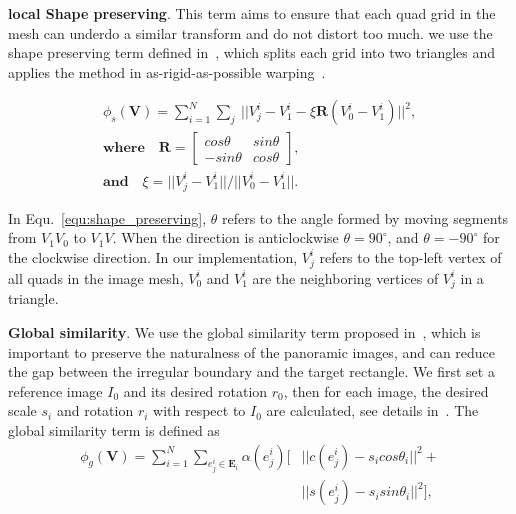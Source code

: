 \documentclass[10pt,journal,compsoc]{IEEEtran}
\begin{document}
\textbf{local Shape preserving}.
This term aims to ensure that each quad grid in the mesh can underdo a similar transform and do not distort too much.
we use the shape preserving term defined in~\cite{journals/tog/LiuYT013}, which splits each grid into two triangles and applies the method in as-rigid-as-possible warping~\cite{journals/tog/IgarashiMH05}.

\begin{equation} \label{equ:shape_preserving}
\begin{split}
    \phi_s(\mathbf{V}) = \sum\limits_{i=1}^N\sum\limits_{j} \
    ||V_j^i -V_1^i-\xi \mathbf{R}(V_0^i -V_1^i)||^2, \\
   \textbf{where}\quad \mathbf{R}=\left[\begin{array}{cc}cos\theta&sin\theta \\-sin\theta&cos\theta\end{array}\right], \\
    \textbf{and} \quad\xi=||V_j^i -V_1^i||/||V_0^i -V_1^i||.
\end{split}
\end{equation}

In Equ.~\ref{equ:shape_preserving}, $\theta$ refers to the angle formed by moving segments from $V_1V_0$ to $V_1V$. 
When the direction is anticlockwise $\theta=90^{\circ}$, and $\theta=-90^{\circ}$ for the clockwise direction. 
In our implementation, $V_j^i$ refers to the top-left vertex of all quads in the image mesh, $V_0^i$ and $V_1^i$ are the neighboring vertices of $V_j^i$ in a triangle.

\textbf{Global similarity}.
We use the global similarity term proposed in~\cite{conf/eccv/ChenC16}, which is important to preserve the naturalness of the panoramic images, and can reduce the gap between the irregular boundary and the target rectangle.
We first set a reference image $I_0$ and its desired rotation $r_0$,  then for each image, the desired scale $s_i$ and rotation $r_i$ with respect to $I_0$ are calculated, see details in~\cite{conf/eccv/ChenC16}. The global similarity term is defined as
\begin{equation} \label{equ:global_similarity}
\begin{split}
    \phi_g(\mathbf{V}) = \sum\limits_{i=1}^N\sum\limits_{e^i_j \in \mathbf{E}_i} \alpha(e^i_j)[&|| c(e^i_j)-s_i cos\theta_i ||^2+\\
    &|| s(e^i_j)-s_i sin\theta_i ||^2],
\end{split}
\end{equation}
\end{document}
